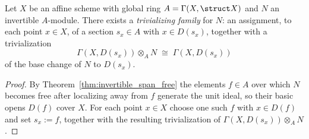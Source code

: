\begin{lemma}
  \label{lem:trivializingFamily_nonempty}
  \leanok
  Let \(X\) be an affine scheme with global ring \(A = \Gamma(X,\struct X)\) and \(N\) an
  invertible \(A\)-module. There exists a \emph{trivializing family} for \(N\): an assignment,
  to each point \(x \in X\), of a section \(s_x \in A\) with \(x \in D(s_x)\), together with a
  trivialization
  \[
    \Gamma(X,D(s_x)) \otimes_A N \;\cong\; \Gamma(X,D(s_x))
  \]
  of the base change of \(N\) to \(D(s_x)\).
\end{lemma}
\begin{proof}
  \leanok
  By Theorem~\ref{thm:invertible_span_free} the elements \(f \in A\) over which \(N\) becomes
  free after localizing away from \(f\) generate the unit ideal, so their basic opens \(D(f)\)
  cover \(X\). For each point \(x \in X\) choose one such \(f\) with \(x \in D(f)\) and set
  \(s_x := f\), together with the resulting trivialization of \(\Gamma(X,D(s_x)) \otimes_A
  N\).
\end{proof}

